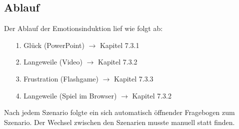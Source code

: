 \subsection{Ablauf} \label{ablauf-1}




Der Ablauf der Emotionsinduktion lief wie folgt ab:

\begin{itemize}
\item[1.] Gl{\"u}ck (PowerPoint) $\rightarrow$ Kapitel 7.3.1
\item[2.] Langeweile (Video) $\rightarrow$ Kapitel 7.3.2
\item[3.] Frustration (Flashgame) $\rightarrow$ Kapitel 7.3.3
\item[4.] Langeweile (Spiel im Browser) $\rightarrow$ Kapitel 7.3.2
\end{itemize}

Nach jedem Szenario folgte ein sich automatisch {\"o}ffnender Fragebogen zum Szenario. 
Der Wechsel zwischen den Szenarien musste manuell statt finden.